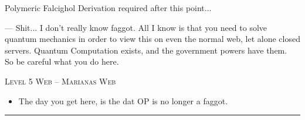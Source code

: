 \documentclass[11pt,twoside,a4paper]{book}
\begin{document}
\begin{LARGE} \begin{center} Polymeric Falcighol Derivation required after this point... \end{center} \end{LARGE}
\begin{small} \begin{center} --- Shit... I don't really know faggot. All I know is that you need to solve quantum mechanics in order to view this on even the normal web, let alone closed servers. Quantum Computation exists, and the government powers have them. ~\\ So be careful what you do here. \end{center} \end{small}

\noindent
\textsc{Level 5 Web -- Marianas Web}

	\begin{itemize}
		\item The day you get here, is the dat OP is no longer a faggot. 
	\end{itemize}


\begin{center} \rule{0.45\textwidth}{0.01cm} \end{center}
\end{document}
